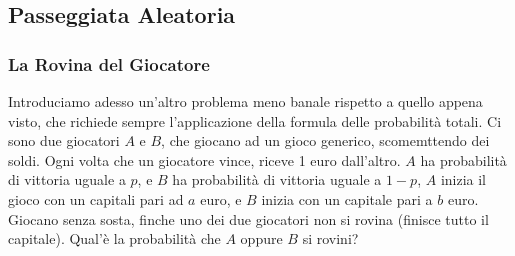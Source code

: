 \documentclass[12pt, letterpaper]{article}
\begin{document}
\subsection{Passeggiata Aleatoria}
\subsubsection{La Rovina del Giocatore}
Introduciamo adesso un'altro problema meno banale rispetto a quello appena visto, che richiede sempre l'applicazione 
della formula delle probabilità totali. Ci sono due giocatori \(A\) e \(B\), che giocano ad un gioco generico, scomemttendo dei soldi. 
Ogni volta che un giocatore vince, riceve 1 euro dall'altro. \(A\) ha probabilità di vittoria uguale a \(p\), 
e \(B\) ha probabilità di vittoria uguale a \(1-p\), \(A\) inizia il gioco con un capitali pari ad \(a\) euro, 
e \(B\) inizia con un capitale pari a \(b\) euro. Giocano senza sosta, finche uno dei due giocatori 
non si rovina (finisce tutto il capitale). Qual'è la probabilità che \(A\) oppure \(B\) si rovini?
\end{document}
